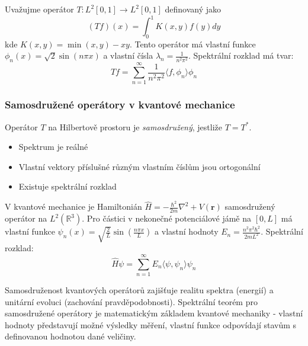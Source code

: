 \begin{example}
Uvažujme operátor $T: L^2[0,1] \to L^2[0,1]$ definovaný jako
\[
(Tf)(x) = \int_0^1 K(x,y)f(y)dy
\]
kde $K(x,y) = \min(x,y) - xy$. Tento operátor má vlastní funkce $\phi_n(x) = \sqrt{2}\sin(n\pi x)$ a vlastní čísla $\lambda_n = \frac{1}{n^2\pi^2}$. Spektrální rozklad má tvar:
\[
Tf = \sum_{n=1}^\infty \frac{1}{n^2\pi^2} \langle f, \phi_n \rangle \phi_n
\]
\end{example}

\subsubsection{Samosdružené operátory v kvantové mechanice}

\begin{definition}
Operátor $T$ na Hilbertově prostoru je \emph{samosdružený}, jestliže $T = T^*$.
\end{definition}

\begin{theorem}
\begin{itemize}
\item Spektrum je reálné
\item Vlastní vektory příslušné různým vlastním číslům jsou ortogonální
\item Existuje spektrální rozklad
\end{itemize}
\end{theorem}

\begin{example}
V kvantové mechanice je Hamiltonián $\hat{H} = -\frac{\hbar^2}{2m}\nabla^2 + V(\mathbf{r})$ samosdružený operátor na $L^2(\mathbb{R}^3)$. Pro částici v nekonečné potenciálové jámě na $[0,L]$ má vlastní funkce $\psi_n(x) = \sqrt{\frac{2}{L}}\sin(\frac{n\pi x}{L})$ a vlastní hodnoty $E_n = \frac{n^2\pi^2\hbar^2}{2mL^2}$. Spektrální rozklad:
\[
\hat{H}\psi = \sum_{n=1}^\infty E_n \langle \psi, \psi_n \rangle \psi_n
\]
\end{example}

\begin{keyinsight}
Samosdruženost kvantových operátorů zajišťuje realitu spektra (energií) a unitární evoluci (zachování pravděpodobnosti). Spektrální teorém pro samosdružené operátory je matematickým základem kvantové mechaniky - vlastní hodnoty představují možné výsledky měření, vlastní funkce odpovídají stavům s definovanou hodnotou dané veličiny.
\end{keyinsight}

